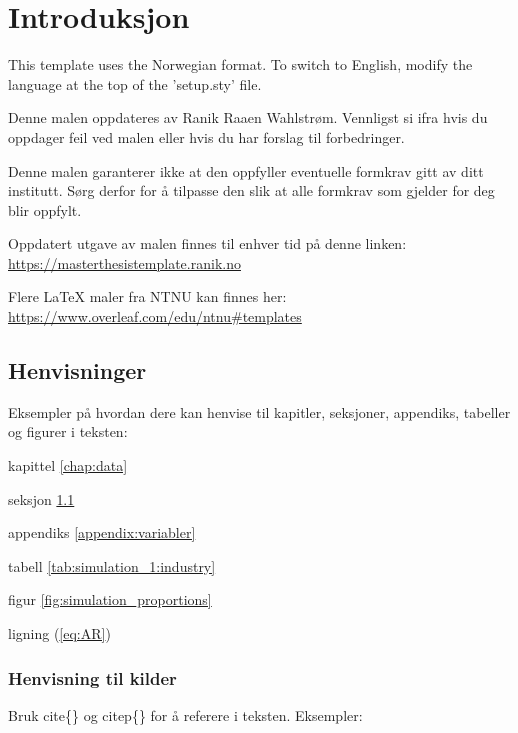 \chapter{Introduksjon}\label{chap:Introduksjon}

This template uses the Norwegian format. To switch to English, modify the language at the top of the 'setup.sty' file.

Denne malen oppdateres av Ranik Raaen Wahlstrøm. Vennligst si ifra hvis du oppdager feil ved malen eller hvis du har forslag til forbedringer.

Denne malen garanterer ikke at den oppfyller eventuelle formkrav gitt av ditt institutt. Sørg derfor for å tilpasse den slik at alle formkrav som gjelder for deg blir oppfylt.

Oppdatert utgave av malen finnes til enhver tid på denne linken:\\
\href{https://masterthesistemplate.ranik.no}{https://masterthesistemplate.ranik.no}

Flere LaTeX maler fra NTNU kan finnes her:\\
\href{https://www.overleaf.com/edu/ntnu#templates}{https://www.overleaf.com/edu/ntnu\#templates}

\section{Henvisninger}
\label{sec:Henvisninger}

Eksempler på hvordan dere kan henvise til kapitler, seksjoner, appendiks, tabeller og figurer i teksten:

kapittel \ref{chap:data}

seksjon \ref{sec:Henvisninger}

appendiks \ref{appendix:variabler}

tabell \ref{tab:simulation_1:industry}

figur \ref{fig:simulation_proportions}

ligning (\ref{eq:AR})


\subsection{Henvisning til kilder}
Bruk cite\{\} og citep\{\} for å referere i teksten. Eksempler:

\citep{paraschiv_bankruptcy_2021} 

\cite{paraschiv_bankruptcy_2021}

